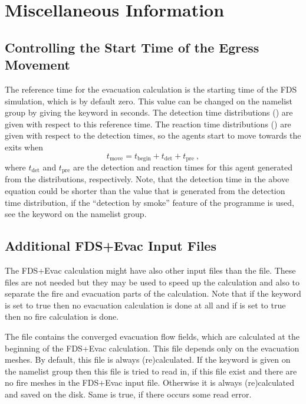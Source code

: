 \documentclass[12pt,a4paper,final,twoside]{stylevk}
\begin{document}
\clearpage

\newpage

\chapter{Miscellaneous Information}\label{Sec_MiscInfo}


\section{Controlling the Start Time of the Egress
  Movement}\label{Sec_TdetTpre}

\noindent The reference time for the evacuation calculation is the
starting time of the FDS simulation, which is by default zero.  This
value can be changed on the  namelist group by giving the
keyword  in seconds.  The detection time distributions
() are given with respect to this reference
time.  The reaction time distributions () are
given with respect to the detection times, so the agents start to move
towards the exits when
\begin{equation}
 t_\textrm{move} = t_\textrm{begin} + t_\textrm{det} + t_\textrm{pre} ~,
\end{equation}
where $t_\textrm{det}$ and $t_\textrm{pre}$ are the detection and
reaction times for this agent generated from the distributions,
respectively.  Note, that the detection time in the above equation
could be shorter than the value that is generated from the detection
time distribution, if the ``detection by smoke'' feature of the
programme is used, see the  keyword on the
 namelist group.


\section{Additional FDS+Evac Input Files}\label{Sec_InFiles}

\noindent The FDS+Evac calculation might have also other input files
than the  file.  These files are not needed but they
may be used to speed up the calculation and also to separate the fire
and evacuation parts of the calculation.  Note that if the keyword
 is set to true then no evacuation calculation
is done at all and if  is set to true then no
fire calculation is done.


The file  contains the converged evacuation flow
fields, which are calculated at the beginning of the FDS+Evac
calculation.  This file depends only on the evacuation meshes.  By
default, this file is always (re)calculated.  If the keyword
 is given on the 
namelist group then this file is tried to read in, if this file exist
and there are no fire meshes in the FDS+Evac input file.  Otherwise it
is always (re)calculated and saved on the disk.  Same is true, if
there occurs some read error.
\end{document}
